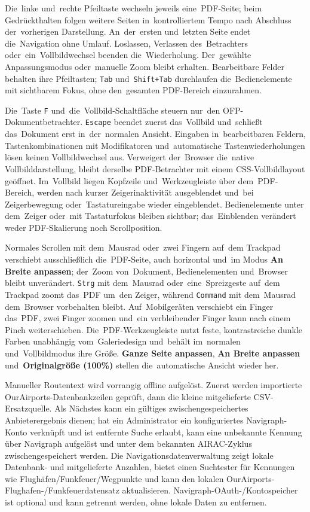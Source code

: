 \documentclass[11pt,a4paper]{article}
\newcommand{\ui}[1]{\textbf{#1}}
\newcommand{\codeword}[1]{\nolinkurl{#1}}
\begin{document}
Die~linke und~rechte Pfeiltaste wechseln jeweils eine~PDF-Seite; beim
Gedrückthalten folgen weitere Seiten in~kontrolliertem Tempo nach Abschluss
der~vorherigen Darstellung. An~der~ersten und~letzten Seite endet die~Navigation
ohne Umlauf. Loslassen, Verlassen des~Betrachters oder~ein~Vollbildwechsel
beenden die~Wiederholung. Der~gewählte Anpassungsmodus oder~manuelle Zoom bleibt
erhalten. Bearbeitbare Felder behalten ihre Pfeiltasten; \codeword{Tab}
und~\codeword{Shift+Tab} durchlaufen die~Bedienelemente mit sichtbarem Fokus,
ohne den~gesamten PDF-Bereich einzurahmen.

Die~Taste \codeword{F} und~die~Vollbild-Schaltfläche steuern nur~den
OFP-Dokumentbetrachter. \codeword{Escape} beendet zuerst das~Vollbild
und~schließt das~Dokument erst in~der~normalen Ansicht. Eingaben
in~bearbeitbaren Feldern, Tastenkombinationen mit Modifikatoren und~automatische
Tastenwiederholungen lösen keinen Vollbildwechsel aus. Verweigert der~Browser
die~native Vollbilddarstellung, bleibt derselbe PDF-Betrachter mit einem
CSS-Vollbildlayout geöffnet. Im~Vollbild liegen Kopfzeile und~Werkzeugleiste
über dem~PDF-Bereich, werden nach kurzer Zeigerinaktivität ausgeblendet und~bei
Zeigerbewegung oder~Tastatureingabe wieder eingeblendet. Bedienelemente unter
dem~Zeiger oder~mit Tastaturfokus bleiben sichtbar; das~Einblenden verändert
weder PDF-Skalierung noch Scrollposition.

Normales Scrollen mit dem~Mausrad oder~zwei Fingern auf~dem Trackpad verschiebt
ausschließlich die~PDF-Seite, auch horizontal und~im Modus \ui{An Breite
anpassen}; der~Zoom von~Dokument, Bedienelementen und~Browser bleibt
unverändert. \codeword{Strg} mit dem~Mausrad oder~eine~Spreizgeste auf~dem
Trackpad zoomt das~PDF um~den Zeiger, während \codeword{Command} mit dem~Mausrad
dem~Browser vorbehalten bleibt. Auf~Mobilgeräten verschiebt ein Finger das~PDF,
zwei Finger zoomen und~ein verbleibender Finger kann nach einem Pinch
weiterschieben. Die~PDF-Werkzeugleiste nutzt feste, kontrastreiche dunkle Farben
unabhängig vom~Galeriedesign und~behält im~normalen und~Vollbildmodus ihre
Größe. \ui{Ganze Seite anpassen}, \ui{An Breite anpassen} und~\ui{Originalgröße
(100\%)} stellen die~automatische Ansicht wieder her.

Manueller Routentext wird vorrangig offline aufgelöst. Zuerst werden importierte
OurAirports-Datenbankzeilen geprüft, dann die kleine mitgelieferte
CSV-Ersatzquelle. Als Nächstes kann ein gültiges zwischengespeichertes
Anbieterergebnis dienen; hat ein Administrator ein konfiguriertes
Navigraph-Konto verknüpft und ist entfernte Suche erlaubt, kann eine unbekannte
Kennung über Navigraph aufgelöst und unter dem bekannten AIRAC-Zyklus
zwischengespeichert werden. Die Navigationsdatenverwaltung zeigt lokale
Datenbank- und mitgelieferte Anzahlen, bietet einen Suchtester für Kennungen wie
Flughäfen/Funkfeuer/Wegpunkte und kann den lokalen
OurAirports-Flughafen-/Funkfeuerdatensatz aktualisieren.
Navigraph-OAuth-/Kontospeicher ist optional und kann getrennt werden, ohne
lokale Daten zu entfernen.
\end{document}
